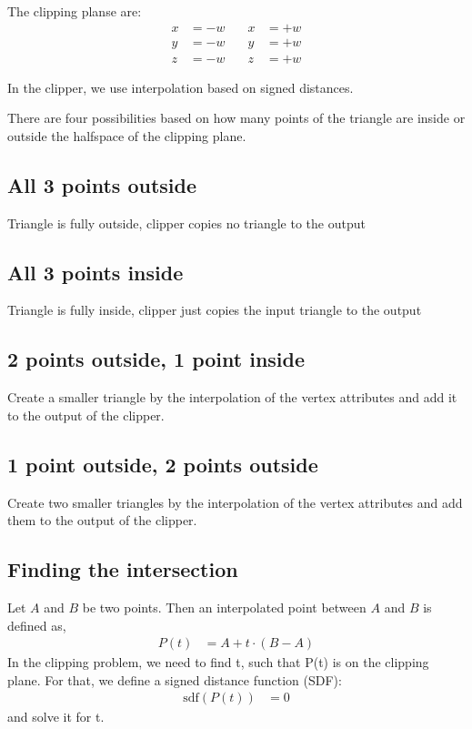 The clipping planse are:
\begin{equation}
\begin{aligned}
x &= -w \quad & x &= +w \\
y &= -w \quad & y &= +w \\
z &= -w \quad & z &= +w
\end{aligned}
\label{eq:clipping_planes}
\end{equation}

In the clipper, we use interpolation based on signed distances.

There are four possibilities based on how many points of the triangle are inside or outside the halfspace of the clipping plane.

\subsection{All 3 points outside}
Triangle is fully outside, clipper copies no triangle to the output

\subsection{All 3 points inside}
Triangle is fully inside, clipper just copies the input triangle to the output

\subsection{2 points outside, 1 point inside}
Create a smaller triangle by the interpolation of the vertex attributes and add it to the output of the clipper.

\subsection{1 point outside, 2 points outside}
Create two smaller triangles by the interpolation of the vertex attributes and add them to the output of the clipper.

\subsection{Finding the intersection}
Let $A$ and $B$ be two points.
Then an interpolated point between $A$ and $B$ is defined as,
\begin{align*}
P(t) &= A + t \cdot (B - A)
\end{align*}
In the clipping problem, we need to find t, such that P(t) is on the clipping plane.
For that, we define a signed distance function (SDF):
\begin{align*}
\text{sdf}(P(t)) &= 0
\end{align*}
and solve it for t.

